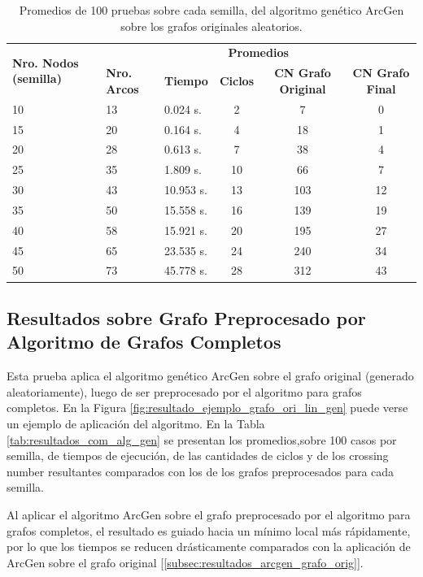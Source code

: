 \begin{table}
	\caption{Promedios de 100 pruebas sobre cada semilla, del algoritmo genético ArcGen sobre los grafos originales aleatorios.}
	\label{tab:resultados_orig_alg_gen}
	\begin{center}
	\begin{tabular}{|p{1.5cm}|p{1.2cm}|p{1.5cm}|c|c|c|}
		\hline
		\multirow{2}{2cm}{\textbf{Nro. Nodos (semilla)}} & \multicolumn{5}{c|}{\textbf{Promedios}} \\
		\cline{2-6}
		& \textbf{Nro. Arcos} & \textbf{Tiempo} & \textbf{Ciclos} & \textbf{CN Grafo Original} & \textbf{CN Grafo Final} \\
		\hline
		10 & 13 & 0.024 s. & 2 & 7 & 0 \\
		\hline
		15 & 20 & 0.164 s. & 4 & 18 & 1 \\
		\hline
		20 & 28 & 0.613 s. & 7 & 38 & 4 \\
		\hline
		25 & 35 & 1.809 s. & 10 & 66 & 7 \\
		\hline
		30 & 43 & 10.953 s. & 13 & 103 & 12 \\
		\hline
		35 & 50 & 15.558 s. & 16 & 139 & 19 \\
		\hline
		40 & 58 & 15.921 s. & 20 & 195 & 27 \\
		\hline
		45 & 65 & 23.535 s. & 24 & 240 & 34 \\
		\hline
		50 & 73 & 45.778 s. & 28 & 312 & 43 \\
		\hline
	\end{tabular}
	
	\end{center}
\end{table}

\subsection{Resultados sobre Grafo Preprocesado por Algoritmo de Grafos Completos}
\label{subsec:resultados_arcgen_grafo_comp}
Esta prueba aplica el algoritmo genético ArcGen sobre el grafo original (generado aleatoriamente), luego de ser preprocesado por el algoritmo para grafos completos. En la Figura \ref{fig:resultado_ejemplo_grafo_ori_lin_gen} puede verse un ejemplo de aplicación del algoritmo. En la Tabla \ref{tab:resultados_com_alg_gen} se presentan los promedios,sobre 100 casos por semilla, de tiempos de ejecución, de las cantidades de ciclos y de los crossing number resultantes comparados con los de los grafos preprocesados para cada semilla.

Al aplicar el algoritmo ArcGen sobre el grafo preprocesado por el algoritmo para grafos completos, el resultado es guiado hacia un mínimo local más rápidamente, por lo que los tiempos se reducen drásticamente comparados con la aplicación de ArcGen sobre el grafo original [\ref{subsec:resultados_arcgen_grafo_orig}].


